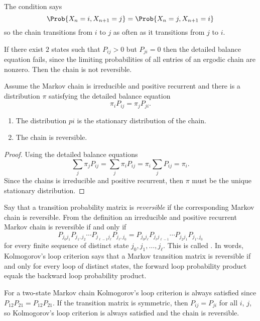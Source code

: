 \documentclass[12pt]{article}
\begin{document}
\begin{remark}
  The condition says
  \[
    \Prob{X_n =i, X_{n+1} = j} = \Prob{X_n =j, X_{n+1} = i}
  \]
  so the chain transitions from $i$ to $j$ as often as it transitions
  from $j$ to $i$.
\end{remark}

\begin{remark}
  If there exist $2$ states such that $P_{ij} > 0$ but $P_{ji} = 0$
  then the detailed balance equation fails, since the limiting probabilities of all
entries of an ergodic chain are nonzero. 
  Then the chain is not reversible.
\end{remark}

\begin{theorem}
  Assume the Markov chain is irreducible and positive recurrent and
  there is a distribution $\pi$ satisfying the detailed balance equation
  \[
    \pi_i P_{ij} = \pi_j P_{ji}.
  \]
  \begin{enumerate}
  \item The distribution $pi$ is the stationary distribution of the chain.
  \item The chain is reversible.
  \end{enumerate}
\end{theorem}

\begin{proof}
  Using the detailed balance equations
  \[
    \sum_j \pi_j P_{ij} = \sum_j \pi_i P_{ij} = \pi_i \sum_j P_{ij} =
    \pi_i.
  \]
  Since the chains is irreducible and positive recurrent, then $\pi$
  must be the unique stationary distribution.
\end{proof}

Say that a transition probability matrix is
\emph{reversible} if the
corresponding Markov chain is reversible.  From the definition an
irreducible and positive recurrent Markov chain is reversible if and
only if
\[
  P_{j_0 j_1} P_{j_1,j_2} \cdots P_{j_{\ell-1} j_\ell} P_{j_\ell, j_0} =
  P_{j_0 j_\ell} P_{j_\ell j_{\ell-1}} \cdots P_{j_2 j_1} P_{j_1, j_0}
\]
for every finite sequence of distinct state $j_0, j_1, \dots, j_\ell$.
This is called .
In words, Kolmogorov’s loop criterion says that a Markov transition matrix is
reversible if and only for every loop of distinct states, the forward loop probability product
equals the backward loop probability product.

For a two-state Markov chain Kolmogorov's loop criterion is always
satisfied since $P_{12} P_{21} = P_{12} P_{21}$.  If the transition
matrix is symmetric, then $P_{ij} = P_{ji}$ for all $i$, $j$, so
Kolmogorov's loop criterion is always satisfied and the chain is
reversible.  
\end{document}
